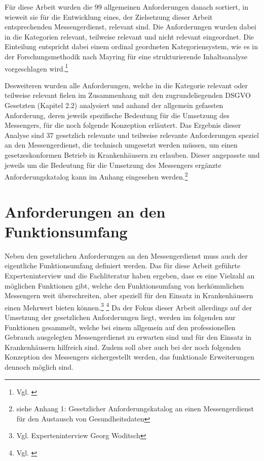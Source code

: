 Für diese Arbeit wurden die 99 allgemeinen Anforderungen danach sortiert, in wieweit sie für die Entwicklung eines, der Zielsetzung dieser Arbeit entsprechenden Messengerdienst, relevant sind. Die Anforderungen wurden dabei in die Kategorien relevant, teilweise relevant und nicht relevant eingeordnet. Die Einteilung entspricht dabei einem ordinal geordneten Kategoriensystem, wie es in der Forschungsmethodik nach Mayring für eine strukturierende Inhaltsanalyse vorgeschlagen wird.\footnote{Vgl. \cite[S. 548 ff.]{Baur2014}}

Desweiteren wurden alle Anforderungen, welche in die Kategorie relevant oder teilweise relevant fielen im Zusammenhang mit den zugrundeliegenden DSGVO Gesetzten (Kapitel 2.2) analysiert und anhand der allgemein gefassten Anforderung, deren jeweils spezifische Bedeutung für die Umsetzung des Messengers, für die noch folgende Konzeption erläutert. 
Das Ergebnis dieser Analyse sind 37 gesetzlich relevante und teilweise relevante Anforderungen speziel an den Messengerdienst, die technisch umgesetzt werden müssen, um einen gesetzeskonformen Betrieb in Krankenhäusern zu erlauben. Dieser angepasste und jeweils um die Bedeutung für die Umsetzung des Messengers ergänzte Anforderungskatalog kann im Anhang eingesehen werden.\footnote{siehe Anhang 1: Gesetzlicher Anforderungskatalog an einen Messengerdienst für den Austausch von Gesundheitsdaten}

\section{Anforderungen an den Funktionsumfang}\label{section:pdimsbd}
Neben den gesetzlichen Anforderungen an den Messengerdienst muss auch der eigentliche Funktionsumfang definiert werden. Das für diese Arbeit geführte Experteninterview und die Fachliteratur haben ergeben, dass es eine Vielzahl an möglichen Funktionen gibt, welche den Funktionsumfang von herkömmlichen Messengern weit überschreiten, aber speziell für den Einsatz in Krankenhäusern einen Mehrwert bieten können.\footnote{Vgl. Experteninterview Georg Woditsch} \footnote{Vgl. \cite[S. 19 4.]{Khan2020}}
Da der Fokus dieser Arbeit allerdings auf der Umsetzung der gesetzlichen Anforderungen liegt, werden im folgenden nur Funktionen gesammelt, welche bei einem allgemein auf den professionellen Gebrauch ausgelegten Messengerdienst zu erwarten sind und für den Einsatz in Krankenhäusern hilfreich sind. Zudem soll aber auch bei der noch folgenden Konzeption des Messengers sichergestellt werden, das funktionale Erweiterungen dennoch möglich sind.

